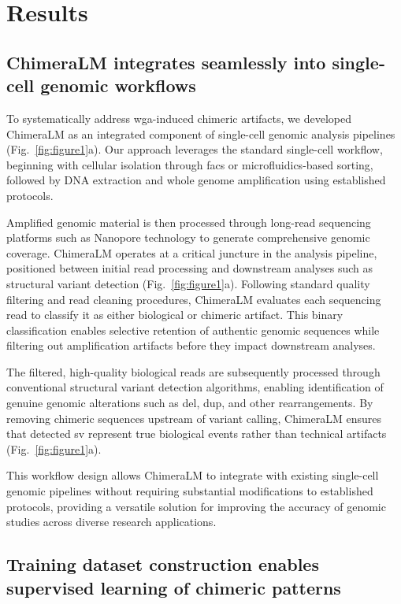 \documentclass[pdflatex,sn-nature]{sn-jnl}%
\theoremstyle{thmstyleone}%
\theoremstyle{thmstyletwo}%
\theoremstyle{thmstylethree}%
\begin{document}
\section*{Results}\label{sec:results}

\subsection*{ChimeraLM integrates seamlessly into single-cell genomic workflows}

To systematically address \gls{wga}-induced chimeric artifacts, we developed ChimeraLM as an integrated component of single-cell genomic analysis pipelines (Fig.~\ref{fig:figure1}a).
Our approach leverages the standard single-cell workflow, beginning with cellular isolation through \gls{facs} or microfluidics-based sorting, followed by DNA extraction and whole genome amplification using established protocols.

Amplified genomic material is then processed through long-read sequencing platforms such as Nanopore technology to generate comprehensive genomic coverage.
ChimeraLM operates at a critical juncture in the analysis pipeline, positioned between initial read processing and downstream analyses such as structural variant detection (Fig.~\ref{fig:figure1}a).
Following standard quality filtering and read cleaning procedures, ChimeraLM evaluates each sequencing read to classify it as either biological or chimeric artifact.
This binary classification enables selective retention of authentic genomic sequences while filtering out amplification artifacts before they impact downstream analyses.

The filtered, high-quality biological reads are subsequently processed through conventional structural variant detection algorithms, enabling identification of genuine genomic alterations such as \gls{del}, \gls{dup}, and other rearrangements.
By removing chimeric sequences upstream of variant calling, ChimeraLM ensures that detected \gls{sv} represent true biological events rather than technical artifacts (Fig.~\ref{fig:figure1}a).

This workflow design allows ChimeraLM to integrate with existing single-cell genomic pipelines without requiring substantial modifications to established protocols, providing a versatile solution for improving the accuracy of genomic studies across diverse research applications.

\subsection*{Training dataset construction enables supervised learning of chimeric patterns}
\end{document}
